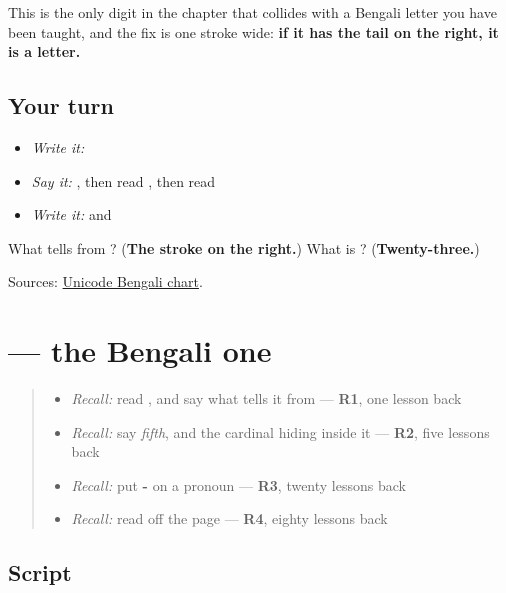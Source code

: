 This is the only digit in the chapter that collides with a Bengali letter you have been taught, and the fix is one stroke wide: \textbf{if it has the tail on the right, it is a letter.}

\subsection*{Your turn}
\begin{itemize}
\raggedright
  \item \emph{Write it:} 
  \item \emph{Say it:} \textbf{}, then read \textbf{}, then read \textbf{}
  \item \emph{Write it:}  and 
\end{itemize}

\begin{tcolorbox}[breakable,colback=teal!4,colframe=teal!35!black,title={Before you move on}]
What tells \textbf{} from \textbf{}? (\textbf{The stroke on the right.}) What is \textbf{}? (\textbf{Twenty-three.})

Sources: \href{https://www.unicode.org/charts/PDF/U0980.pdf}{Unicode Bengali chart}.
\end{tcolorbox}
\section[\texorpdfstring{\bn{১} (digit one)}{১ (digit one)}]{ — the Bengali one}

\label{lesson:BN-W07-digit-one}



\begin{quote}
\begin{itemize}
\raggedright
  \item \emph{Recall:} read \textbf{}, and say what tells it from \textbf{} — \textbf{R1}, one lesson back
  \item \emph{Recall:} say \emph{fifth}, and the cardinal hiding inside it — \textbf{R2}, five lessons back
  \item \emph{Recall:} put \textbf{-} on a pronoun — \textbf{R3}, twenty lessons back
  \item \emph{Recall:} read \textbf{} off the page — \textbf{R4}, eighty lessons back
\end{itemize}
\end{quote}

\subsection*{Script}
\begin{quote}
\end{quote}

